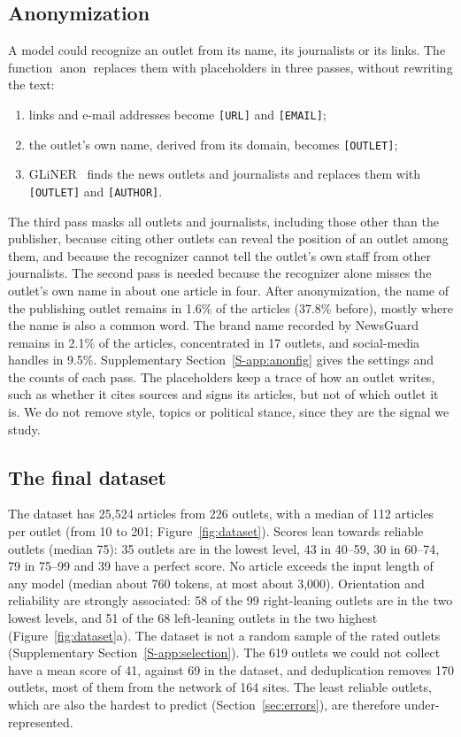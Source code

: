 \documentclass[11pt,a4paper]{article}
\newcommand{\anon}{\operatorname{anon}}
\begin{document}
\subsection{Anonymization}\label{sec:anon}
A model could recognize an outlet from its name, its journalists or its links. The function $\anon$ replaces them with
placeholders in three passes, without rewriting the text:
\begin{enumerate}
  \item links and e-mail addresses become \texttt{[URL]} and \texttt{[EMAIL]};
  \item the outlet's own name, derived from its domain, becomes \texttt{[OUTLET]};
  \item GLiNER~\cite{zaratiana2024gliner} finds the news outlets and journalists and replaces them with
        \texttt{[OUTLET]} and \texttt{[AUTHOR]}.
\end{enumerate}
The third pass masks all outlets and journalists, including those other than the publisher, because citing other
outlets can reveal the position of an outlet among them, and because the recognizer cannot tell the outlet's own staff
from other journalists. The second pass is needed because the recognizer alone misses the outlet's own name in about one
article in four. After anonymization, the name of the publishing outlet remains in 1.6\% of the articles (37.8\%
before), mostly where the name is also a common word. The brand name recorded by NewsGuard remains in 2.1\% of the
articles, concentrated in 17 outlets, and social-media handles in 9.5\%. Supplementary Section~\ref{S-app:anonfig} gives
the settings and the counts of each pass. The placeholders keep a trace of how an outlet writes, such as whether it
cites sources and signs its articles, but not of which outlet it is. We do not remove style, topics or political stance,
since they are the signal we study.

\subsection{The final dataset}\label{sec:final}
The dataset has 25,524 articles from 226 outlets, with a median of 112 articles per outlet (from 10 to 201;
Figure~\ref{fig:dataset}). Scores lean towards reliable outlets (median 75): 35 outlets are in the lowest level, 43 in
40--59, 30 in 60--74, 79 in 75--99 and 39 have a perfect score. No article exceeds the input length of any model (median
about 760 tokens, at most about 3,000). Orientation and reliability are strongly associated: 58 of the 99 right-leaning
outlets are in the two lowest levels, and 51 of the 68 left-leaning outlets in the two highest
(Figure~\ref{fig:dataset}a). The dataset is not a random sample of the rated outlets (Supplementary
Section~\ref{S-app:selection}). The 619 outlets we could not collect have a mean score of 41, against 69 in the
dataset, and deduplication removes 170 outlets, most of them from the network of 164 sites. The least reliable outlets,
which are also the hardest to predict (Section~\ref{sec:errors}), are therefore under-represented.
\end{document}
